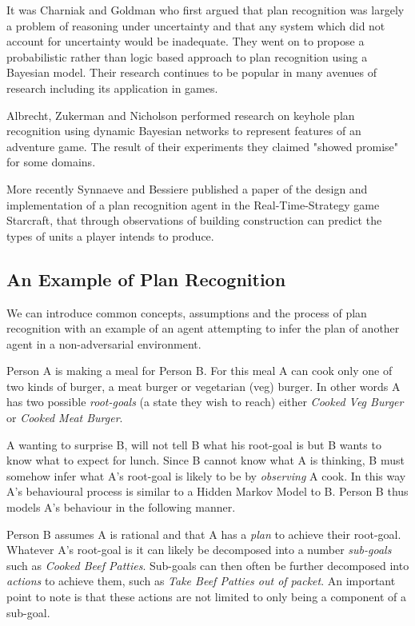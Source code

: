 \documentclass[parskip]{cs4rep}
\begin{document}
It was Charniak and Goldman \cite{journals/ai/CharniakG93} who first argued that plan recognition was largely a problem of reasoning under uncertainty and that any system which did not account for uncertainty would be inadequate. They went on to propose a probabilistic rather than logic based approach to  plan recognition using a Bayesian model. Their research continues to be popular in many avenues of research including its application in games.

Albrecht, Zukerman and Nicholson \cite{Albrecht:1998:BMK:598277.598308} performed research on keyhole plan recognition using dynamic Bayesian networks to represent features of an adventure game. The result of their experiments they claimed "showed promise" for some domains. 

More recently Synnaeve and Bessiere \cite{conf/aiide/SynnaeveB11} published a paper of the design and implementation of a plan recognition agent in the Real-Time-Strategy game Starcraft, that through observations of building construction can predict the types of units a player intends to produce.

\subsection{An Example of Plan Recognition}

We can introduce common concepts, assumptions and the process of plan recognition with an example of an agent attempting to infer the plan of another agent in a non-adversarial environment. 

Person A is making a meal for Person B. For this meal A can cook only one of two kinds of burger, a meat burger or vegetarian (veg) burger. In other words A has two possible \textit{root-goals} (a state they wish to reach) either \textit{Cooked Veg Burger} or \textit{Cooked Meat Burger}. 

A wanting to surprise B, will not tell B what his root-goal is but B wants to know what to expect for lunch. Since B cannot know what A is thinking, B must somehow infer what A's root-goal is likely to be by \textit{observing} A cook. In this way A's behavioural process is similar to a Hidden Markov Model to B. Person B thus models A's behaviour in the following manner. 

Person B assumes A is rational and that A has a \textit{plan} to achieve their root-goal. Whatever A's root-goal is it can likely be decomposed into a number \textit{sub-goals} such as \textit{Cooked Beef Patties}. Sub-goals can then often be further decomposed into \textit{actions} to achieve them, such as \textit{Take Beef Patties out of packet}. An important point to note is that these actions are not limited to only being a component of a sub-goal.
\end{document}

